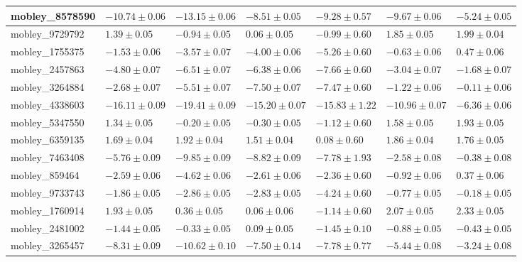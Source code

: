 \documentclass{article}
\begin{document}
\begin{landscape}
\begin{longtable}{|l{3.0cm}|l{3.0cm}|l{3.2cm}|l{3.6cm}|l{3.0cm}|l{3.0cm}|l{3.0cm}|}
mobley\_8578590	&	$	-10.74	\pm	0.06	$	&	$	-13.15	\pm	0.06	$	&	$	-8.51	\pm	0.05	$	&	$	-9.28	\pm	0.57	$	&	$	-9.67	\pm	0.06	$	&	$	-5.24	\pm	0.05	$	\\ \hline
mobley\_9729792	&	$	1.39	\pm	0.05	$	&	$	-0.94	\pm	0.05	$	&	$	0.06	\pm	0.05	$	&	$	-0.99	\pm	0.60	$	&	$	1.85	\pm	0.05	$	&	$	1.99	\pm	0.04	$	\\ \hline
mobley\_1755375	&	$	-1.53	\pm	0.06	$	&	$	-3.57	\pm	0.07	$	&	$	-4.00	\pm	0.06	$	&	$	-5.26	\pm	0.60	$	&	$	-0.63	\pm	0.06	$	&	$	0.47	\pm	0.06	$	\\ \hline
mobley\_2457863	&	$	-4.80	\pm	0.07	$	&	$	-6.51	\pm	0.07	$	&	$	-6.38	\pm	0.06	$	&	$	-7.66	\pm	0.60	$	&	$	-3.04	\pm	0.07	$	&	$	-1.68	\pm	0.07	$	\\ \hline
mobley\_3264884	&	$	-2.68	\pm	0.07	$	&	$	-5.51	\pm	0.07	$	&	$	-7.50	\pm	0.07	$	&	$	-7.47	\pm	0.60	$	&	$	-1.22	\pm	0.06	$	&	$	-0.11	\pm	0.06	$	\\ \hline
mobley\_4338603	&	$	-16.11	\pm	0.09	$	&	$	-19.41	\pm	0.09	$	&	$	-15.20	\pm	0.07	$	&	$	-15.83	\pm	1.22	$	&	$	-10.96	\pm	0.07	$	&	$	-6.36	\pm	0.06	$	\\ \hline
mobley\_5347550	&	$	1.34	\pm	0.05	$	&	$	-0.20	\pm	0.05	$	&	$	-0.30	\pm	0.05	$	&	$	-1.12	\pm	0.60	$	&	$	1.58	\pm	0.05	$	&	$	1.93	\pm	0.05	$	\\ \hline
mobley\_6359135	&	$	1.69	\pm	0.04	$	&	$	1.92	\pm	0.04	$	&	$	1.51	\pm	0.04	$	&	$	0.08	\pm	0.60	$	&	$	1.86	\pm	0.04	$	&	$	1.76	\pm	0.05	$	\\ \hline
mobley\_7463408	&	$	-5.76	\pm	0.09	$	&	$	-9.85	\pm	0.09	$	&	$	-8.82	\pm	0.09	$	&	$	-7.78	\pm	1.93	$	&	$	-2.58	\pm	0.08	$	&	$	-0.38	\pm	0.08	$	\\ \hline
mobley\_859464	&	$	-2.59	\pm	0.06	$	&	$	-4.62	\pm	0.06	$	&	$	-2.61	\pm	0.06	$	&	$	-2.36	\pm	0.60	$	&	$	-0.92	\pm	0.06	$	&	$	0.37	\pm	0.06	$	\\ \hline
mobley\_9733743	&	$	-1.86	\pm	0.05	$	&	$	-2.86	\pm	0.05	$	&	$	-2.83	\pm	0.05	$	&	$	-4.24	\pm	0.60	$	&	$	-0.77	\pm	0.05	$	&	$	-0.18	\pm	0.05	$	\\ \hline
mobley\_1760914	&	$	1.93	\pm	0.05	$	&	$	0.36	\pm	0.05	$	&	$	0.06	\pm	0.06	$	&	$	-1.14	\pm	0.60	$	&	$	2.07	\pm	0.05	$	&	$	2.33	\pm	0.05	$	\\ \hline
mobley\_2481002	&	$	-1.44	\pm	0.05	$	&	$	-0.33	\pm	0.05	$	&	$	0.09	\pm	0.05	$	&	$	-1.45	\pm	0.10	$	&	$	-0.88	\pm	0.05	$	&	$	-0.43	\pm	0.05	$	\\ \hline
mobley\_3265457	&	$	-8.31	\pm	0.09	$	&	$	-10.62	\pm	0.10	$	&	$	-7.50	\pm	0.14	$	&	$	-7.78	\pm	0.77	$	&	$	-5.44	\pm	0.08	$	&	$	-3.24	\pm	0.08	$	\\ \hline

\end{longtable}
\end{landscape}
\end{document}
